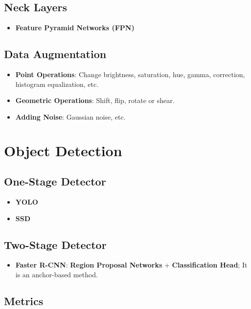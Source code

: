 \documentclass[a4paper]{article}
\begin{document}
\subsection{Neck Layers}

\begin{itemize}
	\item \textbf{Feature Pyramid Networks (FPN)}
\end{itemize}

\subsection{Data Augmentation}

\begin{itemize}
	\item \textbf{Point Operations}: Change brightness, saturation, hue, gamma, correction, histogram equalization, etc.
	\item \textbf{Geometric Operations}: Shift, flip, rotate or shear.
	\item \textbf{Adding Noise}: Gaussian noise, etc.
\end{itemize}

\section{Object Detection}

\subsection{One-Stage Detector}

\begin{itemize}
	\item \textbf{YOLO}
	\item \textbf{SSD}
\end{itemize}

\subsection{Two-Stage Detector}

\begin{itemize}
	\item \textbf{Faster R-CNN}: \textbf{Region Proposal Networks} + \textbf{Classification Head}; It is an anchor-based method.
\end{itemize}

\subsection{Metrics}
\end{document}
